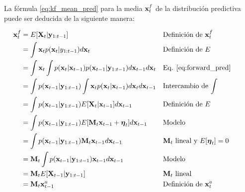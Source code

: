 La fórmula \ref{eq:kf_mean_pred} para la media $\mathbf{x}_t^f$ de la distribución predictiva puede ser deducida de la siguiente manera:

\begin{align*}
    \mathbf{x}_t^f &= E[\mathbf{X}_t | \mathbf{y}_{1:t-1}] && \text{Definición de $\mathbf{x}_t^f$} \\
    &= \int \mathbf{x}_t p(\mathbf{x}_t | y_{1:t-1}) d\mathbf{x}_t && \text{Definición de $E$} \\
    &= \int \mathbf{x}_t \int p(\mathbf{x}_t | \mathbf{x}_{t-1}) p(\mathbf{x}_{t-1} | \mathbf{y}_{1:t-1}) d\mathbf{x}_{t-1} d\mathbf{x}_t && \text{Eq. \ref{eq:forward_pred}} \\
    &= \int p(\mathbf{x}_{t-1} | \mathbf{y}_{1:t-1}) \int \mathbf{x}_t p(\mathbf{x}_t | \mathbf{x}_{t-1}) d\mathbf{x}_t d\mathbf{x}_{t-1} && \text{Intercambio de $\int$}\\ 
    &= \int p(\mathbf{x}_{t-1} | \mathbf{y}_{1:t-1}) E[\mathbf{X}_t | \mathbf{x}_{t-1}] d\mathbf{x}_{t-1} && \text{Definición de $E$}\\
    &= \int p(\mathbf{x}_{t-1} | \mathbf{y}_{1:t-1}) E[\mathbf{M}_t \mathbf{x}_{t-1} + \mbox{\boldmath$ \eta $}_t] d\mathbf{x}_{t-1} && \text{Modelo}\\
    &= \int p(\mathbf{x}_{t-1} | \mathbf{y}_{1:t-1}) \mathbf{M}_t \mathbf{x}_{t-1} d\mathbf{x}_{t-1} && \text{$\mathbf{M}_t$ lineal y $E[\mbox{\boldmath$ \eta $}_t] = 0$}\\
    &= \mathbf{M}_t \int p(\mathbf{x}_{t-1} | \mathbf{y}_{1:t-1}) \mathbf{x}_{t-1} d\mathbf{x}_{t-1} && \text{Modelo} \\
    &= \mathbf{M}_t E[\mathbf{X}_{t-1} | \mathbf{y}_{1:t-1}] && \text{$\mathbf{M}_t$ lineal}\\
    &= \mathbf{M}_t \mathbf{x}_{t-1}^a && \text{Definición de $\mathbf{x}_t^a$} &&
\end{align*}

